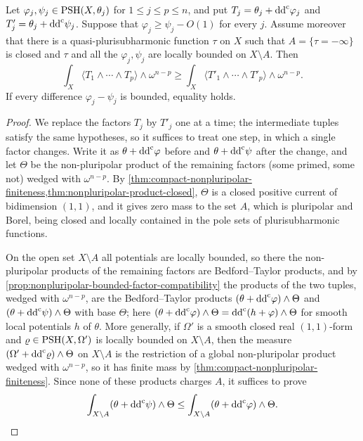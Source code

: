 \begin{lemma}\label{lem:small-locus-mixed-mass-comparison}
Let $\varphi_j,\psi_j\in\mathrm{PSH}(X,\theta_j)$ for $1\leq j\leq p\leq n$, and put $T_j=\theta_j+\mathrm{dd}^{\mathrm{c}}\varphi_j$ and $T'_j=\theta_j+\mathrm{dd}^{\mathrm{c}}\psi_j$. Suppose that $\varphi_j\geq\psi_j-O(1)$ for every $j$. Assume moreover that there is a quasi-plurisubharmonic function $\tau$ on $X$ such that $A=\{\tau=-\infty\}$ is closed and $\tau$ and all the $\varphi_j,\psi_j$ are locally bounded on $X\setminus A$. Then
\[
 \int_X\langle T_1\wedge\cdots\wedge T_p\rangle\wedge\omega^{n-p}
 \geq\int_X\langle T'_1\wedge\cdots\wedge T'_p\rangle\wedge\omega^{n-p}.
\]
If every difference $\varphi_j-\psi_j$ is bounded, equality holds.
\end{lemma}
\begin{proof}
We replace the factors $T_j$ by $T'_j$ one at a time; the intermediate tuples satisfy the same hypotheses, so it suffices to treat one step, in which a single factor changes. Write it as $\theta+\mathrm{dd}^{\mathrm{c}}\varphi$ before and $\theta+\mathrm{dd}^{\mathrm{c}}\psi$ after the change, and let $\Theta$ be the non-pluripolar product of the remaining factors (some primed, some not) wedged with $\omega^{n-p}$. By \cref{thm:compact-nonpluripolar-finiteness,thm:nonpluripolar-product-closed}, $\Theta$ is a closed positive current of bidimension $(1,1)$, and it gives zero mass to the set $A$, which is pluripolar and Borel, being closed and locally contained in the pole sets of plurisubharmonic functions.

On the open set $X\setminus A$ all potentials are locally bounded, so there the non-pluripolar products of the remaining factors are Bedford--Taylor products, and by \cref{prop:nonpluripolar-bounded-factor-compatibility} the products of the two tuples, wedged with $\omega^{n-p}$, are the Bedford--Taylor products $(\theta+\mathrm{dd}^{\mathrm{c}}\varphi)\wedge\Theta$ and $(\theta+\mathrm{dd}^{\mathrm{c}}\psi)\wedge\Theta$ with base $\Theta$; here $(\theta+\mathrm{dd}^{\mathrm{c}}\varphi)\wedge\Theta=\mathrm{dd}^{\mathrm{c}}(h+\varphi)\wedge\Theta$ for smooth local potentials $h$ of $\theta$. More generally, if $\Omega'$ is a smooth closed real $(1,1)$-form and $\varrho\in\mathrm{PSH}(X,\Omega')$ is locally bounded on $X\setminus A$, then the measure $(\Omega'+\mathrm{dd}^{\mathrm{c}}\varrho)\wedge\Theta$ on $X\setminus A$ is the restriction of a global non-pluripolar product wedged with $\omega^{n-p}$, so it has finite mass by \cref{thm:compact-nonpluripolar-finiteness}. Since none of these products charges $A$, it suffices to prove
\[
 \int_{X\setminus A}(\theta+\mathrm{dd}^{\mathrm{c}}\psi)\wedge\Theta\leq\int_{X\setminus A}(\theta+\mathrm{dd}^{\mathrm{c}}\varphi)\wedge\Theta .
\]


\end{proof}
